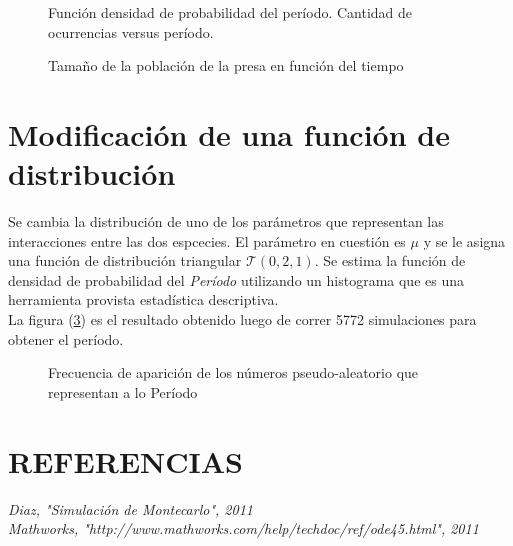 \documentclass{SPANISH_acm_proc_article-sp}
\begin{document}
\begin{figure}
\centering
\label{fig:histo}
\caption{Funci\'on densidad de probabilidad del per\'iodo. Cantidad de ocurrencias versus per\'iodo.}
\end{figure}

\begin{figure}
\centering
\label{fig:presa}
\caption{Tama\~no de la poblaci\'on de la presa en funci\'on del tiempo}
\end{figure}

\section{Modificaci\'on de una funci\'on de distribuci\'on }
Se cambia la distribuci\'on de uno de los par\'ametros que representan las interacciones entre las dos espcecies.
 El par\'ametro en cuesti\'on es $\mu$ y se le asigna una funci\'on de distribuci\'on triangular $\mathcal{T}(0,2,1)$.
 Se estima la funci\'on de densidad de probabilidad del \emph{Per\'iodo} utilizando un histograma que es una herramienta provista estad\'istica descriptiva. 
 \\
 La figura (\ref{fig:histoTriangulo}) es el resultado obtenido luego de correr 5772 simulaciones para obtener el per\'iodo.


\begin{figure}
\centering
{}
\caption{Frecuencia de aparici\'on de los n\'umeros pseudo-aleatorio que representan a lo Per\'iodo}
\label{fig:histoTriangulo}
\end{figure} 
 
\section*{REFERENCIAS}
\textit{Diaz, "Simulaci\'on de Montecarlo", 2011} \\
\textit{Mathworks, "http://www.mathworks.com/help/techdoc/ref/ode45.html", 2011}
\end{document}
